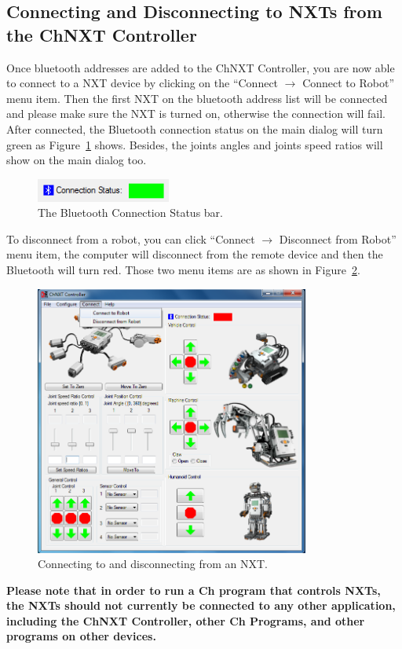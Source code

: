 \documentclass[11pt]{article}
\begin{document}
\subsection{Connecting and Disconnecting to NXTs from the ChNXT Controller}
Once bluetooth addresses are added to the ChNXT Controller, you are now able to 
connect to a NXT device by clicking on the ``Connect $\rightarrow$ Connect to Robot'' 
menu item. Then the first NXT on the bluetooth address list will be connected 
and please make sure the NXT is turned on, otherwise the connection will fail. 
After connected, the Bluetooth connection status on the main dialog will turn
green as Figure~\ref{fig:bt_connection_status} shows. Besides, the joints angles
and joints speed ratios will show on the main dialog too.
\begin{figure}[H]
  \begin{center}
    \includegraphics[height=0.3in]{figure/configuration/btConnectionStatus.png}
    \caption{The Bluetooth Connection Status bar.\label{fig:bt_connection_status}}
  \end{center}
\end{figure}
To disconnect from a robot, you can click ``Connect $\rightarrow$ Disconnect 
from Robot'' menu item, the computer will disconnect from the remote device 
and then the Bluetooth will turn red. Those two menu items are as shown in 
Figure~\ref{fig:menu_connect}.\\
\begin{figure}[H]
  \begin{center}
    \includegraphics[height=3.5in]{figure/configuration/menuConnect.png}
    \caption{Connecting to and disconnecting from an NXT.\label{fig:menu_connect}}
  \end{center}
\end{figure}
{\bf Please note that in order to run a Ch program that controls NXTs, the NXTs 
should not currently be connected to any other application, including the ChNXT 
Controller, other Ch Programs, and other programs on other devices.}\\
\end{document}
